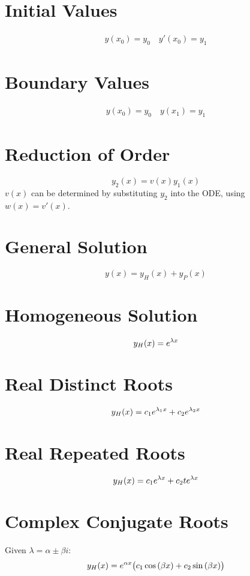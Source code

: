 \documentclass{article}
\begin{document}
\begin{multicols}{3}
    \section*{Initial Values}
    \begin{align*}
        y(x_0) = y_0 \quad y'(x_0) = y_1
    \end{align*}
    \section*{Boundary Values}
    \begin{align*}
        y(x_0) = y_0 \quad y(x_1) = y_1
    \end{align*}
    \section*{Reduction of Order}
    \begin{equation*}
        y_2(x) = v\left(x\right) y_1(x)
    \end{equation*}
    \(v(x)\) can be determined by substituting \(y_2\) into the ODE, using \(w(x) = v'(x)\).
    \section*{General Solution}
    \begin{equation*}
        y(x) = y_H(x) + y_P(x)
    \end{equation*}
    \section*{Homogeneous Solution}
    \begin{equation*}
        y_H(x) = e^{\lambda x}
    \end{equation*}
    \section*{Real Distinct Roots}
    \begin{equation*}
        y_H(x) = c_1e^{\lambda_1 x} + c_2e^{\lambda_2 x}
    \end{equation*}
    \section*{Real Repeated Roots}
    \begin{equation*}
        y_H(x) = c_1e^{\lambda x} + c_2 te^{\lambda x}
    \end{equation*}
    \section*{Complex Conjugate Roots}
    Given \(\lambda = \alpha \pm \beta i\):
    \begin{equation*}
        y_H(x) = e^{\alpha x}\bigl( c_1\cos{\left( \beta x \right)} + c_2 \sin{\left( \beta x \right)} \bigr)
    \end{equation*}

\end{multicols}
\end{document}
